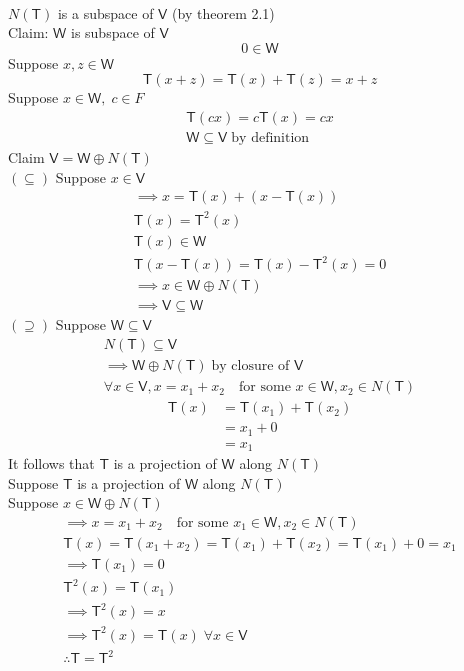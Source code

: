 \paragraph{}$N(\mathsf{T})$ is a subspace of $\mathsf{V}$ (by theorem
2.1)
\\Claim: $\mathsf{W}$ is subspace of $\mathsf{V}$
\begin{equation}
0 \in \mathsf{W}
\end{equation}
Suppose $x,z \in \mathsf{W}$
\begin{equation}
\mathsf{T}(x+z) = \mathsf{T}(x) +\mathsf{T}(z) = x + z
\end{equation}
Suppose $x\in \mathsf{W},\; c\in F$
\begin{gather}
\mathsf{T}(cx) = c\mathsf{T}(x) = cx\\
\mathsf{W} \subseteq \mathsf{V} \;\text{by definition}
\end{gather}
Claim $\mathsf{V} = \mathsf{W} \oplus N(\mathsf{T})$
\\$(\subseteq)$ Suppose $ x \in \mathsf{V}$
\begin{gather}
\implies x = \mathsf{T}(x) + (x -\mathsf{T}(x))\\
\mathsf{T}(x) = \mathsf{T}^2(x)\\
\mathsf{T}(x) \in \mathsf{W}\\
\mathsf{T}(x-\mathsf{T}(x)) = \mathsf{T}(x) - \mathsf{T}^2(x) = 0\\
\implies x \in \mathsf{W} \oplus N(\mathsf{T})\\
\implies \mathsf{V}\subseteq\mathsf{W}
\end{gather}
$(\supseteq)$ Suppose $\mathsf{W}\subseteq\mathsf{V}$
\begin{gather}
N(\mathsf{T}) \subseteq \mathsf{V}\\
\implies \mathsf{W}\oplus N(\mathsf{T})\;\text{by closure of }
\mathsf{V}\\
\forall x \in \mathsf{V}, x = x_1 + x_2\quad\text{for some } x \in
\mathsf{W}, x_2 \in N(\mathsf{T})
\end{gather}
\begin{align}
\mathsf{T}(x) &= \mathsf{T}(x_1) + \mathsf{T}(x_2)\\
&=x_1 + 0\\
&= x_1
\end{align}
It follows that $\mathsf{T}$ is a projection of $\mathsf{W}$ along
$N(\mathsf{T})$
\\Suppose $\mathsf{T}$ is a projection of $\mathsf{W}$ along
$N(\mathsf{T})$
\\Suppose $x \in \mathsf{W}\oplus N(\mathsf{T})$
\begin{gather}
\implies x = x_1 +x_2\quad \text{for some } x_1 \in \mathsf{W}, x_2
\in N(\mathsf{T})\\
\mathsf{T}(x) = \mathsf{T}(x_1 +x_2) = \mathsf{T}(x_1)
+\mathsf{T}(x_2) = \mathsf{T}(x_1) + 0 = x_1\\
\implies \mathsf{T}(x_1) = 0\\
\mathsf{T}^2(x) = \mathsf{T}(x_1)\\
\implies \mathsf{T}^2(x) = x \\
\implies \mathsf{T}^2(x) = \mathsf{T}(x)\; \forall x \in \mathsf{V}\\
\therefore \mathsf{T}=\mathsf{T}^2
\end{gather}
